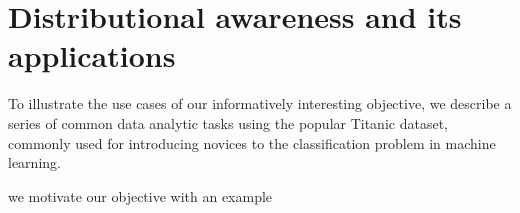 \section{Distributional awareness and its applications\label{sec:distributionaware}}
To illustrate the use cases of our informatively interesting objective, we describe a series of common data analytic tasks using the popular Titanic dataset, commonly used for introducing novices to the classification problem in machine learning\cite{titanic}.



we motivate our objective with an example




